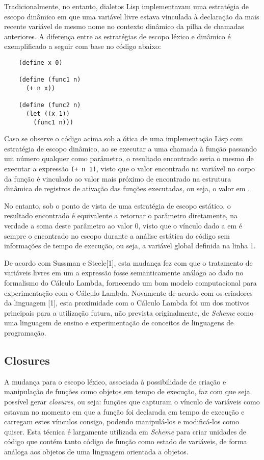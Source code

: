 Tradicionalmente, no entanto, dialetos Lisp implementavam uma estratégia de
escopo dinâmico em que uma variável livre estava vinculada à declaração da mais
recente variável de mesmo nome no contexto dinâmico da pilha de chamadas
anteriores. A diferença entre as estratégias de escopo léxico e dinâmico é 
exemplificado a seguir com base no código abaixo:

\begin{lstlisting}
    (define x 0)
    
    (define (func1 n) 
      (+ n x))
    
    (define (func2 n) 
      (let ((x 1))
        (func1 n)))
\end{lstlisting}

Caso se observe o código acima sob a ótica de uma implementação Lisp com
estratégia de escopo dinâmico, ao se executar a uma chamada à função
 passando um número qualquer  como parâmetro, o resultado
encontrado seria o mesmo de executar a expressão \texttt{(+ n 1)}, visto que o
valor encontrado na variável  no corpo da função  é
vinculado ao valor mais próximo de  encontrado na estrutura dinâmica de
registros de ativação das funções executadas, ou seja, o valor em .

No entanto, sob o ponto de vista de uma estratégia de escopo estático, o
resultado encontrado é equivalente a retornar o parâmetro diretamente, na
verdade a soma deste parâmetro ao valor 0, visto que o vínculo dado a 
em  é sempre o encontrado no escopo durante a análise estática do
código sem informações de tempo de execução, ou seja, a variável global
definida na linha 1.

De acordo com Sussman e Steele[1], esta mudança fez com que o tratamento de
variáveis livres em um a expressão fosse semanticamente análogo ao dado no
formalismo do Cálculo Lambda, fornecendo um bom modelo computacional para
experimentação com o Cálculo Lambda. Novamente de acordo com os criadores da
linguagem [1], esta proximidade com o Cálculo Lambda foi um dos motivos
principais para a utilização futura, não prevista originalmente, de
\textit{Scheme} como uma linguagem de ensino e experimentação de conceitos de
linguagens de programação.

\subsection{Closures}

A mudança para o escopo léxico, associada à possibilidade de criação e
manipulação de funções como objetos em tempo de execução, faz com que seja
possível gerar \textit{closures}, ou seja: funções que capturam o vínculo de
variáveis como estavam no momento em que a função foi declarada em tempo de
execução e carregam estes vínculos consigo, podendo manipulá-los e modificá-los
como quiser. Esta técnica é largamente utilizada em \textit{Scheme} para criar
unidades de código que contém tanto código de função como estado de variáveis,
 de forma análoga aos objetos de uma linguagem orientada a objetos.

